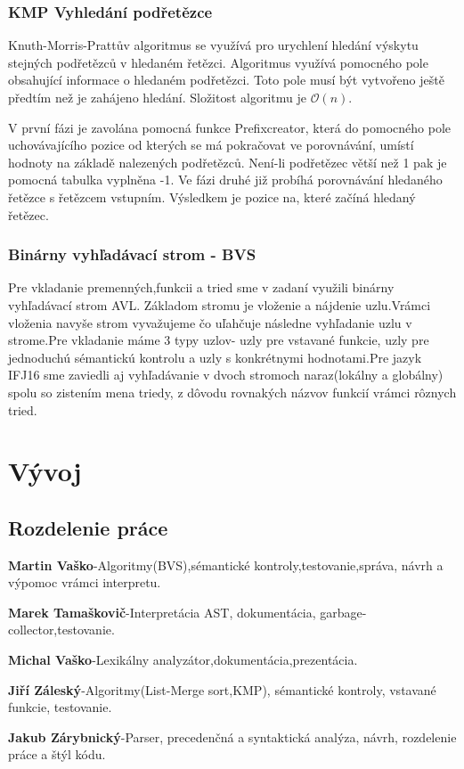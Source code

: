 \documentclass[12pt,a4paper]{report}
\begin{document}
\subsection{KMP Vyhledání podřetězce}
\par Knuth-Morris-Prattův algoritmus se využívá pro urychlení hledání výskytu stejných podřetězců v hledaném řetězci. Algoritmus využívá pomocného pole obsahující informace o hledaném podřetězci. Toto pole musí být vytvořeno ještě předtím než je zahájeno hledání. Složitost algoritmu je $\mathcal{O}(n)$.
\par V první fázi je zavolána pomocná funkce Prefixcreator, která do pomocného pole uchovávajícího pozice od kterých se má pokračovat ve porovnávání, umístí hodnoty na základě nalezených podřetězců. Není-li podřetězec větší než 1 pak je pomocná tabulka vyplněna -1.
Ve fázi druhé již probíhá porovnávání hledaného řetězce s řetězcem vstupním. Výsledkem je pozice na, které začíná hledaný řetězec.


\subsection{Binárny vyhľadávací strom - BVS}
\par Pre vkladanie premenných,funkcii a tried sme v zadaní využili binárny vyhľadávací strom AVL. Základom stromu je vloženie a nájdenie uzlu.Vrámci vloženia navyše strom vyvažujeme čo uľahčuje následne vyhľadanie uzlu v strome.Pre vkladanie máme 3 typy uzlov- uzly pre vstavané funkcie, uzly pre jednoduchú sémantickú kontrolu a uzly s konkrétnymi hodnotami.Pre jazyk IFJ16 sme zaviedli aj vyhľadávanie v dvoch stromoch naraz(lokálny a globálny) spolu so zistením mena triedy, z dôvodu rovnakých názvov funkcií vrámci rôznych tried.

\chapter{Vývoj}

\section{Rozdelenie práce}
\par \textbf{Martin Vaško}-Algoritmy(BVS),sémantické kontroly,testovanie,správa, návrh a výpomoc vrámci interpretu.
\par \textbf{Marek Tamaškovič}-Interpretácia AST, dokumentácia, garbage-collector,testovanie.
\par \textbf{Michal Vaško}-Lexikálny analyzátor,dokumentácia,prezentácia.
\par \textbf{Jiří Záleský}-Algoritmy(List-Merge sort,KMP), sémantické kontroly, vstavané funkcie, testovanie.
\par \textbf{Jakub Zárybnický}-Parser, precedenčná a syntaktická analýza, návrh, rozdelenie práce a štýl kódu.
\end{document}
